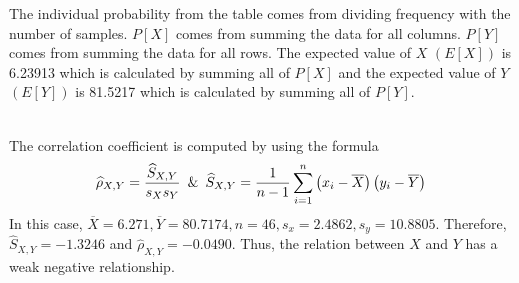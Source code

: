 \noindent The individual probability from the table comes from dividing frequency with the number of samples. $P[X]$ comes from summing the data for all columns. $P[Y]$ comes from summing the data for all rows. The expected value of $X$ $(E[X])$ is 6.23913 which is calculated by summing all of $P[X]$ and the expected value of $Y$ $(E[Y])$ is 81.5217 which is calculated by summing all of $P[Y]$.
\begin{figure}[ht!]
\end{figure}\\
The correlation coefficient is computed by using the formula 
\begin{displaymath}
    \widehat{\rho}_{X, Y} = \dfrac{\widehat{S}_{X, Y}}{s_Xs_Y} \enskip \& \enskip \widehat{S}_{X, Y}=\dfrac{1}{n-1}\displaystyle\sum\limits^n_{i=1}\left(x_i-\overline{X}\right)\left(y_i-\overline{Y}\right)
\end{displaymath}
In this case, \(\overline{X} = 6.271, \overline{Y} = 80.7174, n = 46, s_x = 2.4862, s_y = 10.8805\). Therefore, \(\widehat{S}_{X, Y} = -1.3246\) and \(\widehat{\rho}_{X, Y} = -0.0490\). Thus, the relation between $X$ and $Y$ has a weak negative relationship.\newpage
